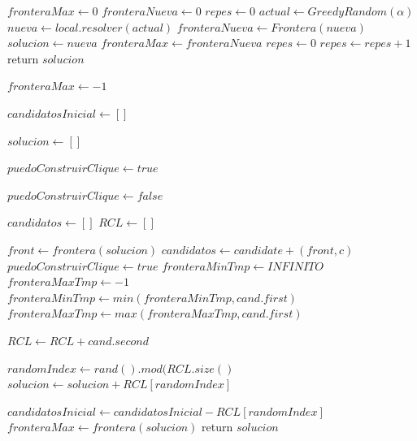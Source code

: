 \begin{algorithm}[H]
\begin{algorithmic}
    \State $fronteraMax \gets 0$
    \State $fronteraNueva \gets 0$
    \State $repes \gets 0$
        \State $actual \gets GreedyRandom(\alpha)$
        \State $nueva \gets local.resolver(actual)$
        \State $fronteraNueva \gets Frontera(nueva)$
            \State $solucion \gets nueva$
            \State $fronteraMax \gets fronteraNueva$
            \State $repes \gets 0$
        \Else
            \State $repes \gets repes + 1$
        \EndIf
    \EndWhile
    \State return $solucion$
\EndFunction
\end{algorithmic}
\end{algorithm}


\begin{algorithm}[H]
\begin{algorithmic}
    \State $fronteraMax \gets -1$

    \State $candidatosInicial \gets []$

    \State $solucion \gets []$

    \State $puedoConstruirClique \gets true$

        \State $puedoConstruirClique \gets false$

        \State $candidatos \gets []$
        \State $RCL \gets []$

                \State $front \gets frontera(solucion)$
                \State $candidatos \gets candidate + (front, c)$
                \State $puedoConstruirClique \gets true$
            \EndIf
        \EndFor
        \State $fronteraMinTmp \gets INFINITO$
        \State $fronteraMaxTmp \gets -1$
            \State $fronteraMinTmp \gets min(fronteraMinTmp, cand.first)$
            \State $fronteraMaxTmp \gets max(fronteraMaxTmp, cand.first)$
        \EndFor

                \State $RCL \gets RCL + cand.second$
            \EndIf
        \EndFor

            \State $randomIndex \gets rand().mod(RCL.size()$
            \State $solucion \gets solucion + RCL[randomIndex]$

            \State $candidatosInicial \gets candidatosInicial - RCL[randomIndex]$
        \EndIf
    \EndWhile
    \State $fronteraMax \gets frontera(solucion)$
    \State return $solucion$
\EndFunction
\end{algorithmic}
\end{algorithm}


